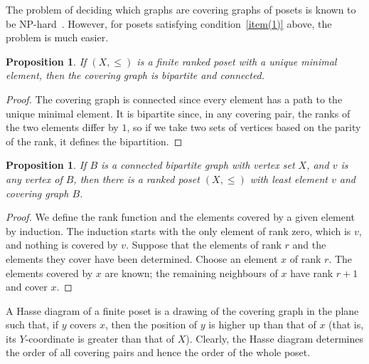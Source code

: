 \documentclass[11pt,twoside]{amsart}
\newtheorem{pro}[theorem]{Proposition}
\begin{document}
The problem of deciding which graphs are covering graphs of posets is
known to be NP-hard~\cite{brightwell1993complexity}. However, for posets satisfying condition~\ref{item(1)} above, the problem is much easier.
\begin{pro}\label{poset(1)}
    If $(X,\leq)$ is a finite ranked poset with a unique minimal
element, then the covering graph is bipartite and connected.
\end{pro}
\begin{proof}
    The covering graph is connected since every element has a path to the unique minimal element. It is bipartite since, in any covering
pair, the ranks of the two elements differ by $1$, so if we take two sets of vertices based on the parity of the rank, it defines the bipartition.
\end{proof}
\begin{pro}\label{poset(2)}
    If $B$ is a connected bipartite graph with vertex set $X$, and $v$ is any vertex of $B$, then there is a ranked poset $(X,\leq)$ with least element $v$ and covering graph $B$.
\end{pro}
\begin{proof}
    We define the rank function and the elements covered by a given
element by induction. The induction starts with the only element of rank zero, which is $v$, and nothing is covered by $v$. Suppose that the elements of rank $r$ and the elements they cover have been determined. Choose an element $x$ of rank
$r$. The elements covered by $x$ are known; the remaining neighbours of $x$ have rank $r+1$ and cover $x$.
\end{proof}
A Hasse diagram of a finite poset is a drawing of the covering graph in
the plane such that, if $y$ covers $x$, then the position of $y$ is higher up than that of $x$ (that is, its $Y$-coordinate is greater than that of $X$). Clearly, the Hasse diagram determines the order of all covering pairs and hence the order
of the whole poset.
\end{document}
